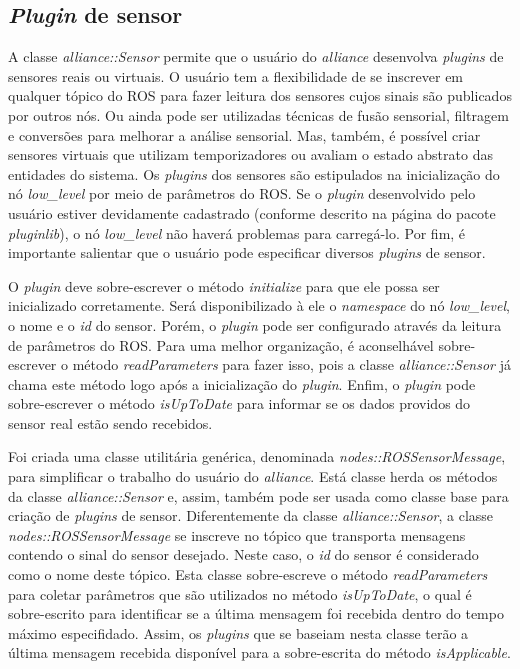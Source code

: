         \subsection{\textit{Plugin} de sensor} \label{subsec:alliance_sensor}
            A classe \textit{alliance::Sensor} permite que o usuário do \textit{alliance} desenvolva \textit{plugins} de sensores reais ou virtuais. O usuário tem a flexibilidade de se inscrever em qualquer tópico do ROS para fazer leitura dos sensores cujos sinais são publicados por outros nós. Ou ainda pode ser utilizadas técnicas de fusão sensorial, filtragem e conversões para melhorar a análise sensorial. Mas, também, é possível criar sensores virtuais que utilizam temporizadores ou avaliam o estado abstrato das entidades do sistema. Os \textit{plugins} dos sensores são estipulados na inicialização do nó \textit{low\_level} por meio de parâmetros do ROS. Se o \textit{plugin} desenvolvido pelo usuário estiver devidamente cadastrado (conforme descrito na página do pacote \textit{pluginlib}), o nó \textit{low\_level} não haverá problemas para carregá-lo. Por fim, é importante salientar que o usuário pode especificar diversos \textit{plugins} de sensor.
            
            
            
            O \textit{plugin} deve sobre-escrever o método \textit{initialize} para que ele possa ser inicializado corretamente. Será disponibilizado à ele o \textit{namespace} do nó \textit{low\_level}, o nome e o \textit{id} do sensor. Porém, o \textit{plugin} pode ser configurado através da leitura de parâmetros do ROS. Para uma melhor organização, é aconselhável sobre-escrever o método \textit{readParameters} para fazer isso, pois a classe \textit{alliance::Sensor} já chama este método logo após a inicialização do \textit{plugin}. Enfim, o \textit{plugin} pode sobre-escrever o método \textit{isUpToDate} para informar se os dados providos do sensor real estão sendo recebidos. 
            
            Foi criada uma classe utilitária genérica, denominada \textit{nodes::ROSSensorMessage}, para simplificar o trabalho do usuário do \textit{alliance}. Está classe herda os métodos da classe \textit{alliance::Sensor} e, assim, também pode ser usada como classe base para criação de \textit{plugins} de sensor. Diferentemente da classe \textit{alliance::Sensor}, a classe \textit{nodes::ROSSensorMessage} se inscreve no tópico que transporta mensagens contendo o sinal do sensor desejado. Neste caso, o \textit{id} do sensor é considerado como o nome deste tópico. Esta classe sobre-escreve o método \textit{readParameters} para coletar parâmetros que são utilizados no método \textit{isUpToDate}, o qual é sobre-escrito para identificar se a última mensagem foi recebida dentro do tempo máximo especifidado. Assim, os \textit{plugins} que se baseiam nesta classe terão a última mensagem recebida disponível para a sobre-escrita do método \textit{isApplicable}.
        
